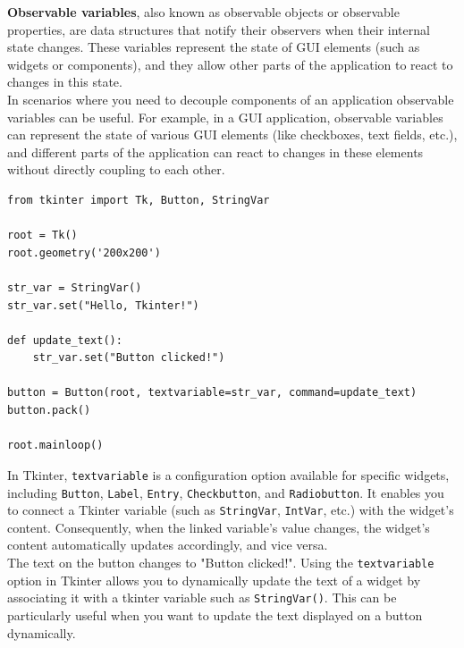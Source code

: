 \textbf{Observable variables}, also known as observable objects or observable properties, are data structures that notify their observers when their internal state changes. These variables represent the state of GUI elements (such as widgets or components), and they allow other parts of the application to react to changes in this state.\\

In scenarios where you need to decouple components of an application observable variables can be useful. For example, in a GUI application, observable variables can represent the state of various GUI elements (like checkboxes, text fields, etc.), and different parts of the application can react to changes in these elements without directly coupling to each other.

\begin{codebox}
\begin{verbatim}
from tkinter import Tk, Button, StringVar
 
root = Tk()
root.geometry('200x200')
 
str_var = StringVar()
str_var.set("Hello, Tkinter!")
 
def update_text():
    str_var.set("Button clicked!")

button = Button(root, textvariable=str_var, command=update_text)
button.pack()
 
root.mainloop()
\end{verbatim}
\end{codebox}

In Tkinter, \texttt{textvariable} is a configuration option available for specific widgets, including \texttt{Button}, \texttt{Label}, \texttt{Entry}, \texttt{Checkbutton}, and \texttt{Radiobutton}. It enables you to connect a Tkinter variable (such as \texttt{StringVar}, \texttt{IntVar}, etc.) with the widget's content. Consequently, when the linked variable's value changes, the widget's content automatically updates accordingly, and vice versa.\\


The text on the button changes to "Button clicked!". Using the \texttt{textvariable} option in Tkinter allows you to dynamically update the text of a widget by associating it with a tkinter variable such as \texttt{StringVar()}. This can be particularly useful when you want to update the text displayed on a button dynamically. 

